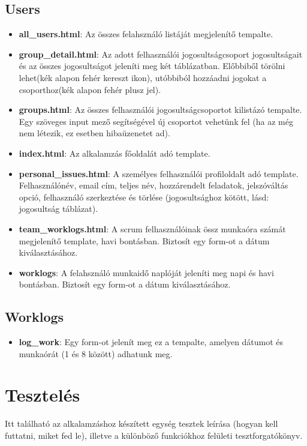 \subsection{Users}
\begin{itemize}
	\item \textbf{all\_users.html}: Az összes felahsználó listáját megjelenítő tempalte.
	\item \textbf{group\_detail.html}: Az adott felhasználói jogosultságcsoport jogosultságait és az összes jogosultságot jeleníti meg két táblázatban. Előbbiből törölni lehet(kék alapon fehér kereszt ikon), utóbbiból hozzáadni jogokat a csoporthoz(kék alapon fehér plusz jel).
	\item \textbf{groups.html}: Az összes felhasználói jogosultságcsoportot kilistázó tempalte. Egy szöveges input mező segítségével új csoportot vehetünk fel (ha az még nem létezik, ez esetben hibaüzenetet ad).
	\item \textbf{index.html}: Az alkalamzás főoldalát adó template.
	\item \textbf{personal\_issues.html}: A személyes felhasználói profiloldalt adó template. Felhasználónév, email cím, teljes név, hozzárendelt feladatok, jelszóváltás opció, felhasználó szerkeztése és törlése (jogosultsághoz kötött, lásd: jogosultság táblázat).
	\item \textbf{team\_worklogs.html}: A scrum felhasználóinak össz munkaóra számát megjelenítő template, havi bontásban. Biztosít egy form-ot a dátum kiválasztásához.
	\item \textbf{worklogs}: A felahsználó munkaidő naplóját jeleníti meg napi és havi bontásban. Biztosít egy form-ot a dátum kiválasztásához.
\end{itemize}
\subsection{Worklogs}
\begin{itemize}
	\item \textbf{log\_work}: Egy form-ot jelenít meg ez a tempalte, amelyen dátumot és munkaórát (1 és 8 között) adhatunk meg.
\end{itemize}

\section{Tesztelés}

Itt található az alkalamzáshoz készített egység tesztek leírása (hogyan kell futtatni, miket fed le), illetve a különböző funkciókhoz felületi tesztforgatókönyv.

